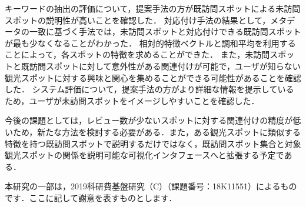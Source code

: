 \documentclass[submit]{ipsj}
\begin{document}
キーワードの抽出の評価について，提案手法の方が既訪問スポットによる未訪問スポットの説明性が高いことを確認した．
対応付け手法の結果として，メタデータの一致に基づく手法では，未訪問スポットと対応付けできる既訪問スポットが最も少なくなることがわかった．
相対的特徴ベクトルと調和平均を利用することによって，各スポットの特徴を求めることができた．
また，未訪問スポットと既訪問スポットに対して意外性がある関連付けが可能で，ユーザが知らない観光スポットに対する興味と関心を集めることができる可能性があることを確認した．
システム評価について，提案手法の方がより詳細な情報を提示しているため，ユーザが未訪問スポットをイメージしやすいことを確認した．

今後の課題としては，レビュー数が少ないスポットに対する関連付けの精度が低いため，新たな方法を検討する必要がある．また，ある観光スポットに類似する特徴を持つ既訪問スポットで説明するだけではなく，既訪問スポット集合と対象観光スポットの関係を説明可能な可視化インタフェースへと拡張する予定である．

\begin{acknowledgment}
本研究の一部は，2019科研費基盤研究（C）（課題番号：18K11551）によるものです．ここに記して謝意を表すものとします．
\end{acknowledgment}
\end{document}
